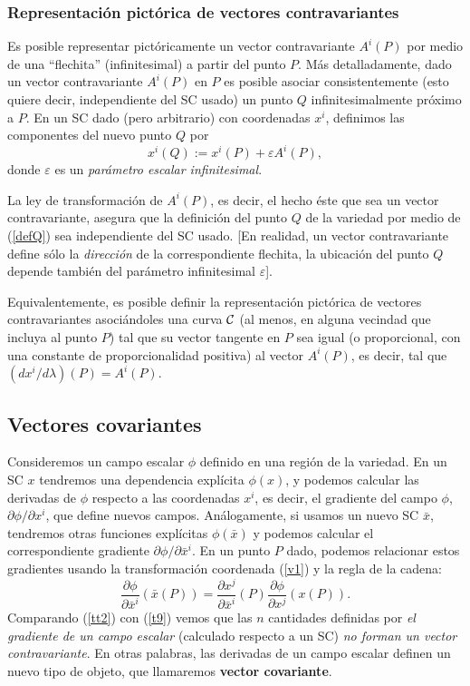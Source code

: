 \subsubsection{Representación pictórica de vectores contravariantes}
Es posible representar pictóricamente un vector contravariante $A^i(P)$ por
medio de una ``flechita'' (infinitesimal) a partir del punto $P$. Más detalladamente, dado un
vector contravariante $A^i(P)$ en $P$ es posible asociar consistentemente (esto quiere decir, independiente del SC usado) un punto $Q$ infinitesimalmente próximo a $P$. En un SC dado (pero arbitrario) con coordenadas $x^i$, definimos las componentes del nuevo punto $Q$ por
\begin{equation}
x^i(Q):=x^i(P)+\varepsilon A^i(P), \label{defQ}
\end{equation}
donde $\varepsilon$ es un \textit{parámetro escalar infinitesimal}.

La ley de transformación de $A^i(P)$, es decir, el hecho éste que sea un vector contravariante, asegura que la definición del punto $Q$ de la variedad por medio de (\ref{defQ}) sea independiente del SC usado. [En realidad, un vector contravariante define sólo la \textit{dirección} de la correspondiente flechita, la ubicación del punto $Q$ depende también del parámetro infinitesimal $\varepsilon$].

Equivalentemente, es posible definir la representación pictórica de vectores contravariantes asociándoles una curva $\cal C$ (al menos, en alguna vecindad que incluya al punto $P$) tal que su vector tangente en $P$ sea igual (o proporcional, con una constante de proporcionalidad positiva) al vector $A^i(P)$, es decir, tal que $(dx^i/d\lambda)(P)=A^i(P)$.

\subsection{Vectores covariantes}

Consideremos un campo escalar $\phi$ definido en una región de la variedad. En
un SC $x$ tendremos una dependencia explícita $\phi(x)$, y podemos calcular
las derivadas de $\phi$ respecto a las coordenadas $x^i$, es decir, el gradiente
del campo $\phi$, ${\partial \phi}/{\partial x^i}$, que define nuevos
campos. Análogamente, si usamos un nuevo SC $\bar{x}$, tendremos otras
funciones explícitas $\phi(\bar{x})$ y podemos calcular el correspondiente
gradiente ${\partial \phi}/{\partial \bar{x}^i}$. En un punto $P$ dado,
podemos relacionar estos gradientes usando la transformación coordenada
(\ref{v1}) y la regla de la cadena:
\begin{equation}
\boxed{\frac{\partial\phi}{\partial \bar{x}^i}(\bar{x}(P))=\frac{\partial x^j
}{\partial\bar{x}^i}(P)\frac{\partial\phi}{\partial x^j}(x(P)).} \label{tt2}
\end{equation}
Comparando (\ref{tt2}) con (\ref{t9}) vemos que las $n$ cantidades definidas por
\textit{el gradiente de un campo escalar} (calculado respecto a un SC) \textit{no forman
un vector contravariante}. En otras palabras, las derivadas de un campo escalar definen un nuevo tipo de objeto, que llamaremos \textbf{vector covariante}.


